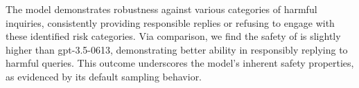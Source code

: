 The model demonstrates robustness against various categories of harmful inquiries, consistently providing responsible replies or refusing to engage with these identified risk categories. 
Via comparison, we find the safety of \llm is slightly higher than gpt-3.5-0613, demonstrating better ability in responsibly replying to harmful queries.
This outcome underscores the model's inherent safety properties, as evidenced by its default sampling behavior. 